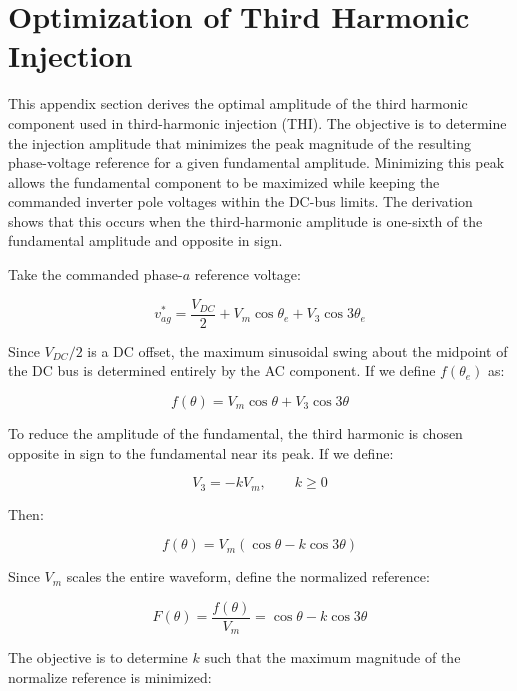 \section{Optimization of Third Harmonic Injection}
\label{app:thi-optimiazation}

This appendix section derives the optimal amplitude of the third harmonic component used in third-harmonic injection (THI). The objective is to determine the injection amplitude that minimizes the peak magnitude of the resulting phase-voltage reference for a given fundamental amplitude. Minimizing this peak allows the fundamental component to be maximized while keeping the commanded inverter pole voltages within the DC-bus limits. The derivation shows that this occurs when the third-harmonic amplitude is one-sixth of the fundamental amplitude and opposite in sign. 

Take the commanded phase-$a$ reference voltage:

\begin{equation}
    v_{ag}^* = \frac{V_{DC}}{2} + V_m\cos\theta_e + V_3\cos3\theta_e
\end{equation}

Since $V_{DC}/2$ is a DC offset, the maximum sinusoidal swing about the midpoint of the DC bus is determined entirely by the AC component. If we define $f(\theta_e)$ as:

\begin{equation}
    f(\theta) = V_m\cos\theta + V_3\cos3\theta
\end{equation}

To reduce the amplitude of the fundamental, the third harmonic is chosen opposite in sign to the fundamental near its peak. If we define:

\begin{equation}
    V_3 = -kV_m, \qquad
    k \geq 0
\end{equation}

Then:

\begin{equation}
    f(\theta) = V_m(\cos\theta - k\cos3\theta)
\end{equation}

Since $V_m$ scales the entire waveform, define the normalized reference:

\begin{equation}
    F(\theta) = \frac{f(\theta)}{V_m} = \cos\theta - k\cos3\theta
\end{equation}

The objective is to determine $k$ such that the maximum magnitude of the normalize reference is minimized:

